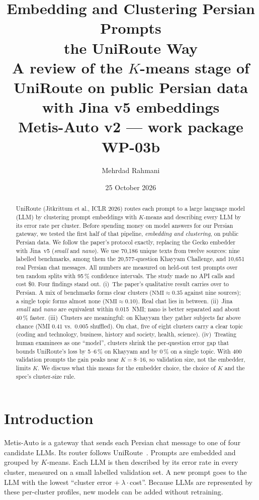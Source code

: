 \documentclass[11pt,a4paper]{article}
\title{\textbf{Embedding and Clustering Persian Prompts\\the UniRoute Way}\\[4pt]
\large A review of the $K$-means stage of UniRoute on public Persian data with Jina v5 embeddings\\[2pt]
\normalsize Metis-Auto v2 --- work package WP-03b}
\author{Mehrdad Rahmani}
\date{25 October 2026}
\newcommand{\nmi}{\mathrm{NMI}}
\begin{document}
\maketitle

\begin{abstract}
\noindent
UniRoute (Jitkrittum et al., ICLR 2026) routes each prompt to a large language model (LLM) by clustering
prompt embeddings with $K$-means and describing every LLM by its error rate per cluster. Before spending
money on model answers for our Persian gateway, we tested the first half of that pipeline, \emph{embedding
and clustering}, on public Persian data. We follow the paper's protocol exactly, replacing the Gecko
embedder with Jina~v5 (\emph{small} and \emph{nano}). We use 70{,}186 unique texts from twelve sources:
nine labelled benchmarks, among them the 20{,}577-question Khayyam Challenge, and 10{,}651 real Persian
chat messages. All numbers are measured on held-out test prompts over ten random splits with
95\,\% confidence intervals. The study made no API calls and cost \$0.
Four findings stand out. (i)~The paper's qualitative result carries over to Persian. A mix of benchmarks
forms clear clusters ($\nmi\approx0.35$ against nine sources); a single topic forms almost none
($\nmi\approx0.10$). Real chat lies in between. (ii)~Jina \emph{small} and \emph{nano} are equivalent within
0.015~NMI; nano is better separated and about 40\,\% faster. (iii)~Clusters are meaningful: on Khayyam they
gather subjects far above chance (NMI $0.41$ vs.\ $0.005$ shuffled). On chat, five of eight clusters carry a
clear topic (coding and technology, business, history and society, health, science). (iv)~Treating human
examinees as one ``model'', clusters shrink the per-question error gap that bounds UniRoute's loss by
5--6\,\% on Khayyam and by 0\,\% on a single topic. With 400 validation prompts the gain peaks near
$K=8$--$16$, so validation size, not the embedder, limits $K$. We discuss what this means for the embedder
choice, the choice of $K$ and the spec's cluster-size rule.
\end{abstract}

\tableofcontents
\newpage

\section{Introduction}

Metis-Auto is a gateway that sends each Persian chat message to one of four candidate LLMs. Its router follows
UniRoute~\cite{uniroute}. Prompts are embedded and grouped by $K$-means. Each LLM is then described by its
error rate in every cluster, measured on a small labelled validation set. A new prompt goes to the LLM with the
lowest ``cluster error $+\ \lambda\cdot$cost''. Because LLMs are represented by these per-cluster profiles, new
models can be added without retraining.
\end{document}
